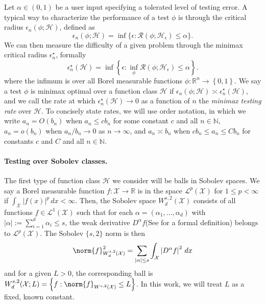 \documentclass{article}
\newcommand{\Reals}{\mathbb{R}}
\newcommand{\abs}[1]{\left \lvert #1 \right \rvert}
\newcommand{\set}[1]{\left\{#1\right\}}
\newcommand{\1}{\mathbf{1}}
\newcommand{\Xset}{\mathcal{X}}
\theoremstyle{alden}
\theoremstyle{aldenthm}
\theoremstyle{definition}
\theoremstyle{remark}
\begin{document}
Let $\alpha \in (0,1)$ be a user input specifying a tolerated level of testing error. A typical way to characterize the performance of a test $\phi$ is through the critical radius $\epsilon_n(\phi; \mathcal{H})$, defined as
\begin{equation*}
\epsilon_n(\phi; \mathcal{H}) = \inf\{\epsilon: \mathcal{R}(\phi; \mathcal{H}_{\epsilon}) \leq \alpha\}.
\end{equation*}
We can then measure the difficulty of a given problem through the minimax critical radius $\epsilon_n^{\star}$, formally 
\begin{equation*}
\epsilon_n^{\star}(\mathcal{H}) = \inf \set{\epsilon:\inf_{\phi} \mathcal{R}(\phi; \mathcal{H}_{\epsilon} ) \leq \alpha}.
\end{equation*}
where the infimum is over all Borel measurable functions $\phi: \Reals^n \to \set{0,1}$. We say a test $\phi$ is minimax optimal over a function class $\mathcal{H}$ if $\epsilon_n(\phi; \mathcal{H}) \asymp \epsilon_n^{\star}(\mathcal{H})$, and we call the rate at which $\epsilon_n^{\star}(\mathcal{H}) \to 0$ as a function of $n$ the \emph{minimax testing rate} over $\mathcal{H}$. To concisely state rates, we will use order notation, in which we write $a_n = O(b_n)$ when $a_n \leq c b_n$ for some constant $c$ and all $n \in \mathbb{N}$, $a_n = o(b_n)$ when $a_n/b_n \to 0$ as $n \to \infty$, and $a_n \asymp b_n$ when $c b_n \leq a_n \leq C b_n$ for constants $c$ and $C$ and all $n \in \mathbb{N}$.

\paragraph{Testing over Sobolev classes.}
The first type of function class $\mathcal{H}$ we consider will be balls in Sobolev spaces. We say a Borel measurable function $f: \mathcal{X} \to \Reals$ is in the space $\mathcal{L}^p(\mathcal{X})$ for $1 \leq p < \infty$ if $\int_{\mathcal{X}} \abs{f(x)}^p \,dx < \infty$. Then, the Sobolev space $W_d^{s,2}(\mathcal{X})$ consists of all functions $f \in \mathcal{L}^1(\mathcal{X})$ such that for each $\alpha = (\alpha_1,\ldots,\alpha_d)$ with $\abs{\alpha} := \sum_{i = 1}^{d} \alpha_i \leq s$, the weak derivative $D^{\alpha}f$(See \citet{evans10} for a formal definition) belongs to $\mathcal{L}^p(\mathcal{X})$. The Sobolev $\{s,2\}$ norm is then 
\begin{equation*}
\norm{f}_{W_d^{s,2}(\mathcal{X})}^2 = \sum_{\abs{\alpha} \leq s} \int_{\mathcal{X}} \abs{D^{\alpha}f}^2 \,dx
\end{equation*}
and for a given $L > 0$, the corresponding ball is $W_d^{s,2}(\Xset; L) = \set{f: \norm{f}_{W^{s,2}(\Xset)} \leq L}$. In this work, we will treat $L$ as a fixed, known constant.
\end{document}
